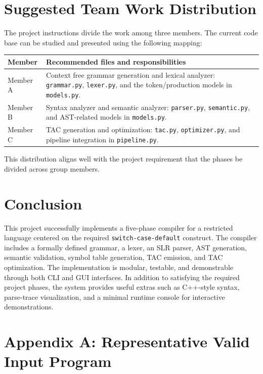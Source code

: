 \documentclass[12pt,a4paper]{article}
\begin{document}
\section{Suggested Team Work Distribution}
The project instructions divide the work among three members. The current code base can be studied and presented using the following mapping:

\begin{center}
\begin{tabular}{|p{}|p{}|}
\hline
\textbf{Member} & \textbf{Recommended files and responsibilities} \\
\hline
Member A & Context free grammar generation and lexical analyzer: \texttt{grammar.py}, \texttt{lexer.py}, and the token/production models in \texttt{models.py}. \\
\hline
Member B & Syntax analyzer and semantic analyzer: \texttt{parser.py}, \texttt{semantic.py}, and AST-related models in \texttt{models.py}. \\
\hline
Member C & TAC generation and optimization: \texttt{tac.py}, \texttt{optimizer.py}, and pipeline integration in \texttt{pipeline.py}. \\
\hline
\end{tabular}
\end{center}

This distribution aligns well with the project requirement that the phases be divided across group members.

\section{Conclusion}
This project successfully implements a five-phase compiler for a restricted language centered on the required \texttt{switch-case-default} construct. The compiler includes a formally defined grammar, a lexer, an SLR parser, AST generation, semantic validation, symbol table generation, TAC emission, and TAC optimization. The implementation is modular, testable, and demonstrable through both CLI and GUI interfaces. In addition to satisfying the required project phases, the system provides useful extras such as C++-style syntax, parse-trace visualization, and a minimal runtime console for interactive demonstrations.

\clearpage
\appendix
\section{Appendix A: Representative Valid Input Program}
\end{document}
